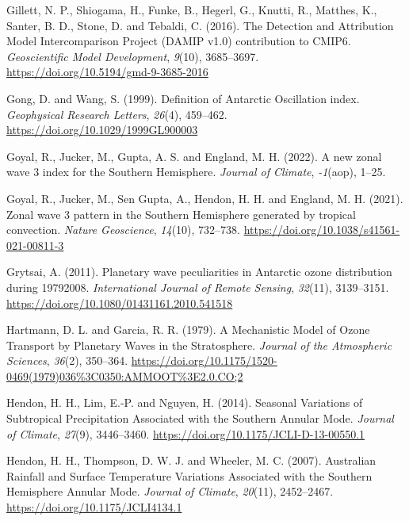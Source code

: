 \documentclass[12pt,oneside,a4paper]{reedthesis}
\newlength{\cslhangindent}
\newenvironment{CSLReferences}[2] %
 {%
  \setlength{\parindent}{0pt}
  \ifodd #1 \everypar{\setlength{\hangindent}{\cslhangindent}}\ignorespaces\fi
  \ifnum #2 > 0
  \setlength{\parskip}{#2\baselineskip}
  \fi
 }%
 {}
\begin{document}
\begin{CSLReferences}{1}{0}
\leavevmode{}%
Gillett, N. P., Shiogama, H., Funke, B., Hegerl, G., Knutti, R., Matthes, K., Santer, B. D., Stone, D. and Tebaldi, C. (2016). The {Detection} and {Attribution Model Intercomparison Project} ({DAMIP} v1.0) contribution to {CMIP6}. \emph{Geoscientific Model Development}, \emph{9}(10), 3685--3697. \url{https://doi.org/10.5194/gmd-9-3685-2016}

\leavevmode{}%
Gong, D. and Wang, S. (1999). Definition of {Antarctic Oscillation} index. \emph{Geophysical Research Letters}, \emph{26}(4), 459--462. \url{https://doi.org/10.1029/1999GL900003}

\leavevmode{}%
Goyal, R., Jucker, M., Gupta, A. S. and England, M. H. (2022). A new zonal wave 3 index for the {Southern Hemisphere}. \emph{Journal of Climate}, \emph{-1}(aop), 1--25.

\leavevmode{}%
Goyal, R., Jucker, M., Sen Gupta, A., Hendon, H. H. and England, M. H. (2021). Zonal wave 3 pattern in the {Southern Hemisphere} generated by tropical convection. \emph{Nature Geoscience}, \emph{14}(10), 732--738. \url{https://doi.org/10.1038/s41561-021-00811-3}

\leavevmode{}%
Grytsai, A. (2011). Planetary wave peculiarities in {Antarctic} ozone distribution during 1979{\textendash}2008. \emph{International Journal of Remote Sensing}, \emph{32}(11), 3139--3151. \url{https://doi.org/10.1080/01431161.2010.541518}

\leavevmode{}%
Hartmann, D. L. and Garcia, R. R. (1979). A {Mechanistic Model} of {Ozone Transport} by {Planetary Waves} in the {Stratosphere}. \emph{Journal of the Atmospheric Sciences}, \emph{36}(2), 350--364. \url{https://doi.org/10.1175/1520-0469(1979)036\%3C0350:AMMOOT\%3E2.0.CO;2}

\leavevmode{}%
Hendon, H. H., Lim, E.-P. and Nguyen, H. (2014). Seasonal {Variations} of {Subtropical Precipitation Associated} with the {Southern Annular Mode}. \emph{Journal of Climate}, \emph{27}(9), 3446--3460. \url{https://doi.org/10.1175/JCLI-D-13-00550.1}

\leavevmode{}%
Hendon, H. H., Thompson, D. W. J. and Wheeler, M. C. (2007). Australian {Rainfall} and {Surface Temperature Variations Associated} with the {Southern Hemisphere Annular Mode}. \emph{Journal of Climate}, \emph{20}(11), 2452--2467. \url{https://doi.org/10.1175/JCLI4134.1}


\end{CSLReferences}
\end{document}
